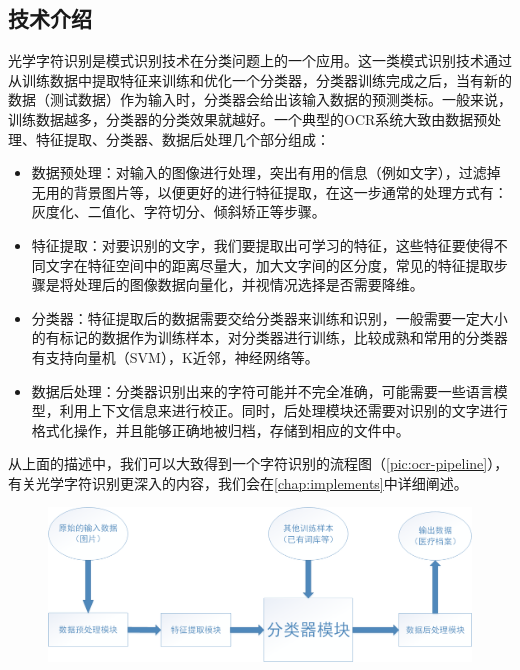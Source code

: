 \subsection{技术介绍}
光学字符识别是模式识别技术在分类问题上的一个应用。这一类模式识别技术通过从训练数据中提取特征来训练和优化一个分类器，分类器训练完成之后，当有新的数据（测试数据）作为输入时，分类器会给出该输入数据的预测类标。一般来说，训练数据越多，分类器的分类效果就越好。一个典型的OCR系统大致由数据预处理、特征提取、分类器、数据后处理几个部分组成：
\begin{itemize}
	\item 数据预处理：对输入的图像进行处理，突出有用的信息（例如文字），过滤掉无用的背景图片等，以便更好的进行特征提取，在这一步通常的处理方式有：灰度化、二值化、字符切分、倾斜矫正等步骤。
	\item 特征提取：对要识别的文字，我们要提取出可学习的特征，这些特征要使得不同文字在特征空间中的距离尽量大，加大文字间的区分度，常见的特征提取步骤是将处理后的图像数据向量化，并视情况选择是否需要降维。
	\item 分类器：特征提取后的数据需要交给分类器来训练和识别，一般需要一定大小的有标记的数据作为训练样本，对分类器进行训练，比较成熟和常用的分类器有支持向量机（SVM），K近邻，神经网络等。
	\item 数据后处理：分类器识别出来的字符可能并不完全准确，可能需要一些语言模型，利用上下文信息来进行校正。同时，后处理模块还需要对识别的文字进行格式化操作，并且能够正确地被归档，存储到相应的文件中。
\end{itemize}
从上面的描述中，我们可以大致得到一个字符识别的流程图（\autoref{pic:ocr-pipeline}），有关光学字符识别更深入的内容，我们会在\autoref{chap:implements}中详细阐述。

\begin{figure}[htbp]
\centering
  \includegraphics[scale=0.3]{figures/ocr-pipeline}
  \label{pic:ocr-pipeline}
\end{figure}

